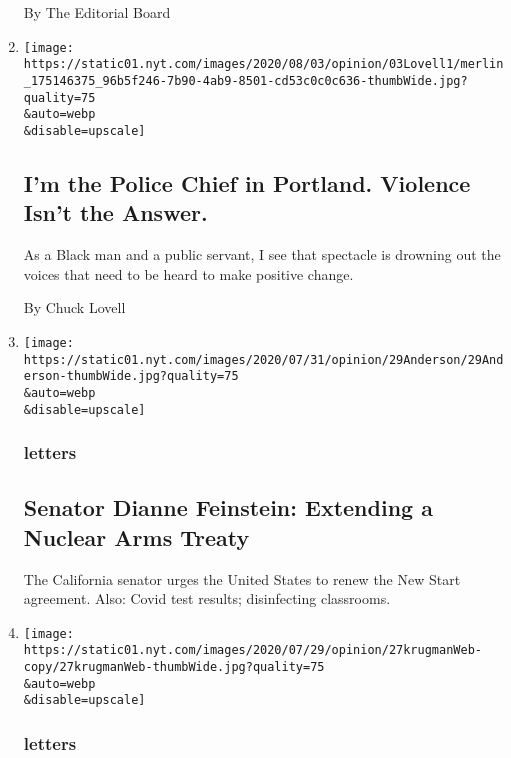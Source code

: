 \begin{enumerate}
  By The Editorial Board
\item
  \href{/2020/08/03/opinion/portland-protests-police-chief.html}{}

  \texttt{[image: https://static01.nyt.com/images/2020/08/03/opinion/03Lovell1/merlin\_175146375\_96b5f246-7b90-4ab9-8501-cd53c0c0c636-thumbWide.jpg?quality=75\\\&auto=webp\\\&disable=upscale]}

  \hypertarget{im-the-police-chief-in-portland-violence-isnt-the-answer}{%
  \subsection{I'm the Police Chief in Portland. Violence Isn't the
  Answer.}\label{im-the-police-chief-in-portland-violence-isnt-the-answer}}

  As a Black man and a public servant, I see that spectacle is drowning
  out the voices that need to be heard to make positive change.

  By Chuck Lovell
\item
  \href{/2020/08/03/opinion/letters/nuclear-arms-treaty.html}{}

  \texttt{[image: https://static01.nyt.com/images/2020/07/31/opinion/29Anderson/29Anderson-thumbWide.jpg?quality=75\\\&auto=webp\\\&disable=upscale]}

  \hypertarget{letters-2}{%
  \subsubsection{letters}\label{letters-2}}

  \hypertarget{senator-dianne-feinstein-extending-a-nuclear-arms-treaty}{%
  \subsection{Senator Dianne Feinstein: Extending a Nuclear Arms
  Treaty}\label{senator-dianne-feinstein-extending-a-nuclear-arms-treaty}}

  The California senator urges the United States to renew the New Start
  agreement. Also: Covid test results; disinfecting classrooms.
\item
  \href{/2020/08/03/opinion/letters/selfishness-society.html}{}

  \texttt{[image: https://static01.nyt.com/images/2020/07/29/opinion/27krugmanWeb-copy/27krugmanWeb-thumbWide.jpg?quality=75\\\&auto=webp\\\&disable=upscale]}

  \hypertarget{letters-3}{%
  \subsubsection{letters}\label{letters-3}}


\end{enumerate}
